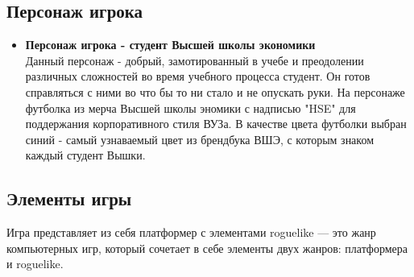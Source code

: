 \documentclass{article}
\begin{document}
\subsection{Персонаж игрока}
    \begin{itemize}
    \item \textbf{Персонаж игрока - студент Высшей школы экономики} \\
    Данный персонаж - добрый, замотированный в учебе и преодолении различных сложностей во время учебного процесса студент. Он готов справляться с ними во что бы то ни стало и не опускать руки. На персонаже футболка из мерча Высшей школы эномики с надписью "HSE" для поддержания корпоративного стиля ВУЗа. В качестве цвета футболки выбран синий - самый узнаваемый цвет из брендбука ВШЭ, с которым знаком каждый студент Вышки. 
    \end{itemize}
\subsection{Элементы игры}
    Игра представляет из себя платформер с элементами roguelike — это жанр компьютерных игр, который сочетает в себе элементы двух  жанров: платформера и roguelike.  
\end{document}

